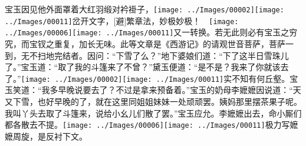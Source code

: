 宝玉因见他外面罩着大红羽缎对衿褂子，{{\texttt{[image: ../Images/00002]}\texttt{[image: ../Images/00011]}\footnotesize \kaishu 岔开文字，{[}避{]}繁章法，妙极妙极！　}\texttt{[image: ../Images/00006]}\texttt{[image: ../Images/00011]}\footnotesize \kaishu 又一转换。若无此则必有宝玉之穷究，而宝钗之重复，加长无味。此等文章是《西游记》的请观世音菩萨，菩萨一到，无不扫地完结者。}因问：``下雪了么？''地下婆娘们道：``下了这半日雪珠儿了。''宝玉道：``取了我的斗篷来了不曾？''黛玉便道：``是不是？我来了你就该去了。''{\texttt{[image: ../Images/00002]}\texttt{[image: ../Images/00011]}\footnotesize \kaishu 实不知有何丘壑。}宝玉笑道：``我多早晚说要去了？不过是拿来预备着。''宝玉的奶母李嬷嬷因说道：``天又下雪，也好早晚的了，就在这里同姐姐妹妹一处顽顽罢。姨妈那里摆茶果子呢。我叫丫头去取了斗篷来，说给小幺儿们散了罢。''宝玉应允。李嬷嬷出去，命小厮们都各散去不提。{\texttt{[image: ../Images/00006]}\texttt{[image: ../Images/00011]}\footnotesize \kaishu 极力写嬷嬷周旋，是反衬下文。}

